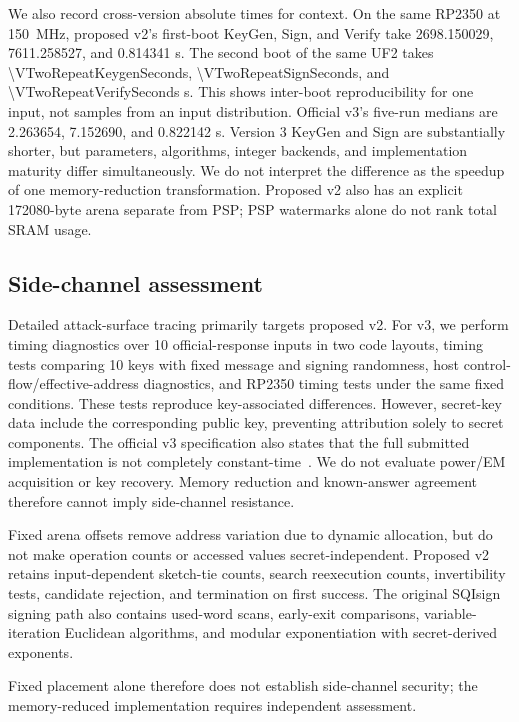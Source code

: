 \documentclass[a4paper,10pt]{article}
\theoremstyle{definition}
\theoremstyle{remark}
\begin{document}
We also record cross-version absolute times for context. On the same RP2350 at \SI{150}{\mega\hertz}, proposed v2's first-boot KeyGen, Sign, and Verify take \num{2698.150029}, \num{7611.258527}, and \num{0.814341} s. The second boot of the same UF2 takes \num{\VTwoRepeatKeygenSeconds}, \num{\VTwoRepeatSignSeconds}, and \num{\VTwoRepeatVerifySeconds} s. This shows inter-boot reproducibility for one input, not samples from an input distribution. Official v3's five-run medians are \num{2.263654}, \num{7.152690}, and \num{0.822142} s. Version 3 KeyGen and Sign are substantially shorter, but parameters, algorithms, integer backends, and implementation maturity differ simultaneously. We do not interpret the difference as the speedup of one memory-reduction transformation. Proposed v2 also has an explicit \num{172080}-byte arena separate from PSP; PSP watermarks alone do not rank total SRAM usage.

\subsection{Side-channel assessment}
\label{sec:sca}

Detailed attack-surface tracing primarily targets proposed v2. For v3, we perform timing diagnostics over 10 official-response inputs in two code layouts, timing tests comparing 10 keys with fixed message and signing randomness, host control-flow/effective-address diagnostics, and RP2350 timing tests under the same fixed conditions. These tests reproduce key-associated differences. However, secret-key data include the corresponding public key, preventing attribution solely to secret components. The official v3 specification also states that the full submitted implementation is not completely constant-time~\cite{sqisign-spec-v3}. We do not evaluate power/EM acquisition or key recovery. Memory reduction and known-answer agreement therefore cannot imply side-channel resistance.

Fixed arena offsets remove address variation due to dynamic allocation, but do not make operation counts or accessed values secret-independent. Proposed v2 retains input-dependent sketch-tie counts, search reexecution counts, invertibility tests, candidate rejection, and termination on first success. The original SQIsign signing path also contains used-word scans, early-exit comparisons, variable-iteration Euclidean algorithms, and modular exponentiation with secret-derived exponents.

Fixed placement alone therefore does not establish side-channel security; the memory-reduced implementation requires independent assessment.
\end{document}
